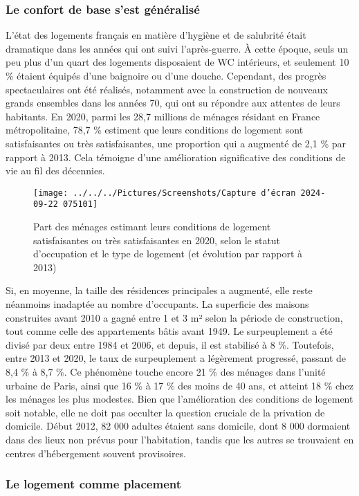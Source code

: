 \documentclass[a4paper, 12pt]{report}
\begin{document}
\subsubsection{Le confort de base s’est généralisé}

L’état des logements français en matière d’hygiène et de salubrité était dramatique dans les années qui ont suivi l’après-guerre. À cette époque, seuls un peu plus d’un quart des logements disposaient de WC intérieurs, et seulement 10 \% étaient équipés d’une baignoire ou d’une douche. Cependant, des progrès spectaculaires ont été réalisés, notamment avec la construction de nouveaux grands ensembles dans les années 70, qui ont su répondre aux attentes de leurs habitants. En 2020, parmi les 28,7 millions de ménages résidant en France métropolitaine, 78,7 \% estiment que leurs conditions de logement sont satisfaisantes ou très satisfaisantes, une proportion qui a augmenté de 2,1 \% par rapport à 2013. Cela témoigne d'une amélioration significative des conditions de vie au fil des décennies.
\newpage
\begin{wrapfigure}{r}{0.6\textwidth}
	\centering
\texttt{[image: ../../../Pictures/Screenshots/Capture d'écran 2024-09-22 075101]}
\caption{Part des ménages estimant leurs conditions de logement satisfaisantes ou très satisfaisantes en 2020, selon le statut d’occupation et le type de logement (et évolution par rapport à 2013)}
\end{wrapfigure}

Si, en moyenne, la taille des résidences principales a augmenté, elle reste néanmoins inadaptée au nombre d’occupants. La superficie des maisons construites avant 2010 a gagné entre 1 et 3 m² selon la période de construction, tout comme celle des appartements bâtis avant 1949. Le surpeuplement a été divisé par deux entre 1984 et 2006, et depuis, il est stabilisé à 8 \%. Toutefois, entre 2013 et 2020, le taux de surpeuplement a légèrement progressé, passant de 8,4 \% à 8,7 \%. Ce phénomène touche encore 21 \% des ménages dans l’unité urbaine de Paris, ainsi que 16 \% à 17 \% des moins de 40 ans, et atteint 18 \% chez les ménages les plus modestes. Bien que l'amélioration des conditions de logement soit notable, elle ne doit pas occulter la question cruciale de la privation de domicile. Début 2012, 82 000 adultes étaient sans domicile, dont 8 000 dormaient dans des lieux non prévus pour l’habitation, tandis que les autres se trouvaient en centres d’hébergement souvent provisoires.

\subsubsection{Le logement comme placement}
\end{document}
